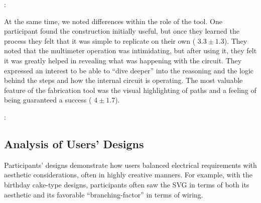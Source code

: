 \documentclass{sigchi}
\begin{document}
  \begin{myquote}
   \vspace{-2pt}
    :
    \vspace{-2pt}
  \end{myquote}

  At the same time, we noted differences within the role of the tool. One participant found the construction initially useful, but once they learned the process they felt that it was simple to replicate on their own ( $3.3 \pm 1.3$).   They noted that the multimeter operation was intimidating, but after using it, they felt it was greatly helped in revealing what was happening with the circuit. They expressed an interest to be able to ``dive deeper'' into the reasoning and the logic behind the steps and how the internal circuit is operating. The most valuable feature of the fabrication tool was the visual highlighting of paths and a feeling of being guaranteed a success ( $4 \pm 1.7$). 

  \begin{myquote}
   \vspace{-2pt}
    :
    \vspace{-2pt}
  \end{myquote}




% 
  
\subsection{Analysis of Users' Designs}
  Participants' designs demonstrate how users balanced electrical requirements with aesthetic considerations, often in highly creative manners. For example, with the birthday cake-type designs, participants often saw the SVG in terms of both its aesthetic and its favorable ``branching-factor'' in terms of wiring.
  
\end{document}

